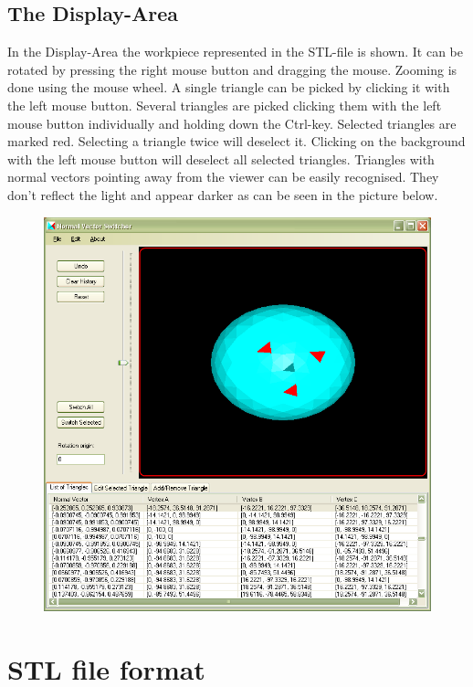 \newpage
\section{The Display-Area}\label{displayArea}

In the Display-Area the workpiece represented in the STL-file is shown. It can be rotated by pressing the right mouse button and dragging the mouse. Zooming is done using the mouse wheel. A single triangle can be picked by clicking it with the left mouse button. Several triangles are picked clicking them with the left mouse button individually and holding down the Ctrl-key. Selected triangles are marked red. Selecting a triangle twice will deselect it. Clicking on the background with the left mouse button will deselect all selected triangles. Triangles with normal vectors pointing away from the viewer can be easily recognised. They don't reflect the light and appear darker as can be seen in the picture below.

\begin{figure}[hb]
	\centering
	\includegraphics[width=0.9\linewidth]{window5}
\end{figure}


\chapter{STL file format}\label{stlFormat}

